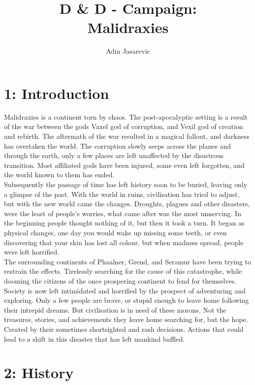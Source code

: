 \documentclass[a4paper]{article}
\title{D \& D - Campaign: \\ Malidraxies}
\author{Adin Jasarevic}
\begin{document}
\begin{titlepage}
\maketitle
\end{titlepage}
\makeatletter
\renewcommand\thesection{}
\renewcommand\thesubsection{\@arabic\c@section.\@arabic\c@subsection}
\makeatother
\section{1: Introduction}
Malidraxies is a continent torn by chaos. The post-apocalyptic setting is a result of the war between the gods Vaxel god of corruption, and Vexil god of creation and rebirth. The aftermath of the war resulted in a magical fallout, and darkness has overtaken the world. The corruption slowly seeps across the planes and through the earth, only a few places are left unaffected by the disastrous transition. Most affiliated gods have been injured, some even left forgotten, and the world known to them has ended.\\ Subsequently the passage of time has left history soon to be buried, leaving only a glimpse of the past. With the world in ruins, civilisation has tried to adjust, but with the new world came the changes. Droughts, plagues and other disasters, were the least of people's worries, what came after was the most unnerving. In the beginning people thought nothing of it, but then it took a turn. It began as physical changes, one day you would wake up missing some teeth, or even discovering that your skin has lost all colour, but when madness spread, people were left horrified.\\
The surrounding continents of Phaalner, Grend, and Seramur have been trying to restrain the effects. Tirelessly searching for the cause of this catastrophe, while dooming the citizens of the once prospering continent to fend for themselves.\\
Society is now left intimidated and horrified by the prospect of adventuring and exploring. Only a few people are brave, or stupid enough to leave home following their intrepid dreams. But civilisation is in need of these morons. Not the treasures, stories, and achievements they leave home searching for, but the hope. Created by their sometimes shortsighted and rash decisions. Actions that could lead to a shift in this disaster that has left mankind baffled.
\newpage
\tableofcontents
\newpage

\section{2: History}
\end{document}
